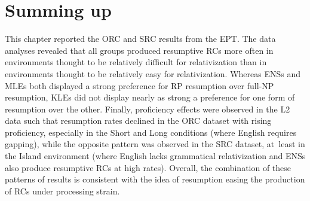 \section{Summing up}\label{ept-conclusion}

This chapter reported the ORC and SRC results from the EPT. The data analyses revealed that all groups produced resumptive RCs more often in environments thought to be relatively difficult for relativization than in environments thought to be relatively easy for relativization. Whereas ENSs and MLEs both displayed a strong preference for RP resumption over full-NP resumption, KLEs did not display nearly as strong a preference for one form of resumption over the other. Finally, proficiency effects were observed in the L2 data such that resumption rates declined in the ORC dataset with rising proficiency, especially in the Short and Long conditions (where English requires gapping), while the opposite pattern was observed in the SRC dataset, at~least in the Island environment (where English lacks grammatical relativization and ENSs also produce resumptive RCs at high rates). Overall, the combination of these patterns of results is consistent with the idea of resumption easing the production of RCs under processing strain.